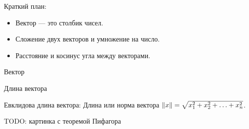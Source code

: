 \documentclass[14pt,xcolor=dvipsnames]{beamer}
\begin{document}
\begin{frame}{Краткий план:}
  \begin{itemize}
    \item Вектор — это столбик чисел.
    \item Сложение двух векторов и умножение на число.
    \item Расстояние и косинус угла между векторами.
  \end{itemize}
  
\end{frame}


\begin{frame}{Вектор}




\end{frame}
  



 


\begin{frame}{Длина вектора}

    \begin{block}{Евклидова длина вектора:}
    Длина или норма вектора $\norm{x} = \sqrt{x_1^2 + x_2^2 + \ldots + x_n^2}$.
    \end{block}

    \begin{block}{TODO: картинка с теоремой Пифагора}

    \end{block}
    
\end{frame}
\end{document}
